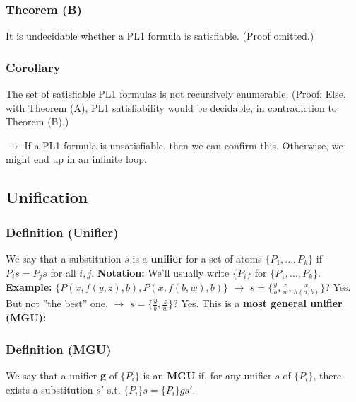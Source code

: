 \documentclass[conference, a4paper]{styles/acmsiggraph}
\begin{document}
        \subsubsection{Theorem (B)}
            It is undecidable whether a PL1 formula is satisfiable. (Proof omitted.)
        
        \subsubsection{Corollary}
            The set of satisfiable PL1 formulas is not recursively enumerable. 
            (Proof: Else, with Theorem (A), PL1 satisfiability would be decidable, in contradiction to Theorem (B).)
        
        $\rightarrow$ If a PL1 formula is unsatisfiable, then we can confirm this. 
            Otherwise, we might end up in an infinite loop.
    
    
    
    
    
    
    
    
    \subsection{Unification}
        \subsubsection{Definition (Unifier)}
            We say that a substitution $s$ is a \textbf{unifier} for a set of atoms $\{P_1,...,P_k\}$ if $P_is = P_js$ for all $i,j$.\newline
            \textbf{Notation:} We'll usually write $\{P_i\}$ for $\{P_1,...,P_k\}$.\newline
            \textbf{Example:} $\{P(x,f(y,z),b),P(x,f(b,w),b)\}$\newline
                $\rightarrow$ $s = \{\frac{y}{b},\frac{z}{w},\frac{x}{h(a,b)}\}$? Yes. But not ''the best'' one.\newline
                $\rightarrow$ $s = \{\frac{y}{b},\frac{z}{w}\}$? Yes. This is a \textbf{most general unifier (MGU):}
            
        \subsubsection{Definition (MGU)}
            We say that a unifier \textbf{g} of $\{P_i\}$ is an \textbf{MGU} if, for any unifier $s$ of $\{P_i\}$, there exists a substitution $s'$ s.t. $\{P_i\}s = \{P_i\}gs'$.
        
\end{document}
